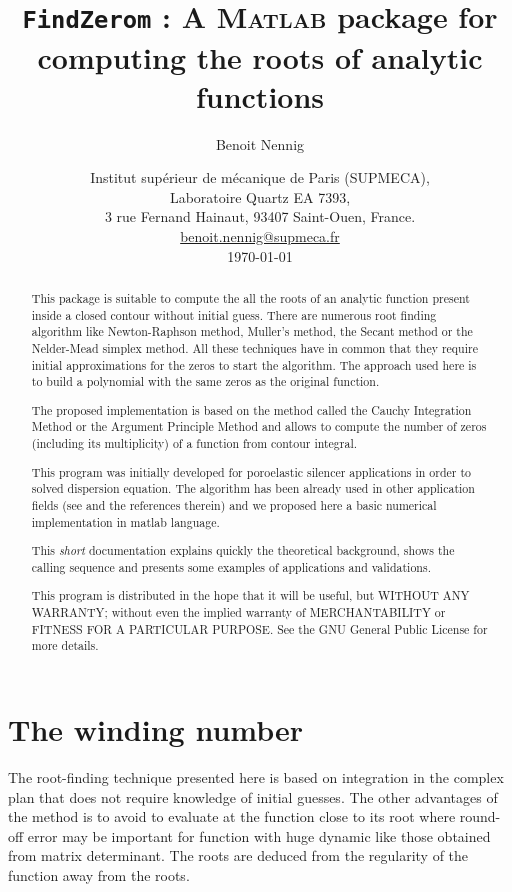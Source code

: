 \documentclass[a4paper,10pt]{article}
\title{\texttt{FindZerom} : A \textsc{Matlab} package for computing the roots of analytic functions}
\author{Benoit Nennig}
\date{Institut sup\'erieur de m\'ecanique de Paris (SUPMECA),\\ Laboratoire Quartz EA 7393,\\
3 rue Fernand Hainaut, 93407 Saint-Ouen, France.\\[0.5cm]
\url{benoit.nennig@supmeca.fr}\\[0.5cm]
\today}
\begin{document}
\maketitle
\begin{abstract}
This package is suitable to compute the all the roots of an analytic function present inside a closed contour without initial guess. There are numerous root finding algorithm like Newton-Raphson method, Muller's method, the Secant method or the Nelder-Mead simplex method. All these techniques have in common that they require initial approximations for the zeros to start the algorithm.  The approach used here is to build a polynomial with the same zeros as the original function.

The proposed implementation is based on the method called the Cauchy Integration Method or the Argument Principle Method and allows to compute the number of zeros (including its multiplicity) of a function from contour integral.

This program was initially developed for poroelastic silencer applications\cite{Nennig:2010} in order to solved dispersion equation. The algorithm has been already used in other application fields (see \cite{Delves:1967,Chen:2000,Kravanja:2000} and the references therein) and we proposed here a basic numerical implementation in matlab language.

This \emph{short} documentation explains quickly the theoretical background, shows the calling sequence and presents some examples of applications and validations.

This program is distributed in the hope that it will be useful, but WITHOUT ANY WARRANTY; without even the implied warranty of    MERCHANTABILITY or FITNESS FOR A PARTICULAR PURPOSE.  See the GNU General Public License for more details.

\end{abstract}


\section{The winding number}
The root-finding technique presented here is based on integration in the complex plan that does not require knowledge of initial guesses. 
The other advantages of the method is to avoid to evaluate at the function close to its root where round-off error may be important for function with huge dynamic like those obtained from matrix determinant. The roots are deduced from the regularity of the function away from the roots.
\end{document}
